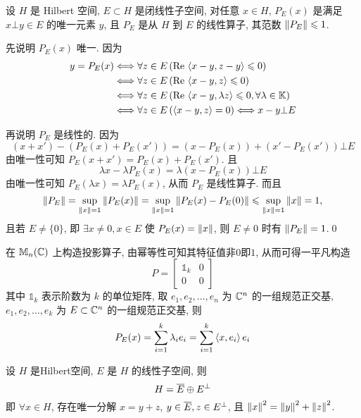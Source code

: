 		\begin{Theorem}[投影线性算子]
			 设 $ H $ 是 Hilbert 空间, $ E\subset H $ 是闭线性子空间,  对任意 $ x\in H $, $ P_{E}(x) $ 是满足 $ x\bot y\in E $ 的唯一元素 $ y $, 且 $ P_{E} $ 是从 $ H $ 到 $ E $ 的线性算子, 其范数 $ \norm{P_{E}}\leqslant1 $.
		\end{Theorem}
			
		\begin{Proof}
			先说明 $ P_{E}(x) $ 唯一. 因为
			\[
				\begin{aligned}
					y=P_{E}(x) & \Longleftrightarrow \forall z\in E\,(\Re\lrangle{x-y, z-y}\leqslant0)\\
					& \Longleftrightarrow \forall z\in E\,(\Re\lrangle{x-y, z}\leqslant0)\\
					& \Longleftrightarrow \forall z\in E\,(\Re\lrangle{x-y, \lambda z}\leqslant0, \forall \lambda\in \K)\\
					& \Longleftrightarrow \forall z\in E\,(\lrangle{x-y, z}=0)\Longleftrightarrow x-y\bot E
				\end{aligned}
			\]

			再说明 $ P_{E} $ 是线性的. 因为
			\[
				(x+x')-(P_{E}(x)+P_{E}(x'))=(x-P_{E}(x))+(x'-P_{E}(x'))\bot E
			\]
			由唯一性可知 $ P_{E}(x+x')=P_{E}(x)+P_{E}(x') $. 且
			\[
				\lambda x-\lambda P_{E}(x)=\lambda(x-P_{E}(x))\bot E
			\]
			由唯一性可知 $ P_{E}(\lambda x)=\lambda P_{E}(x) $, 从而 $ P_{E} $ 是线性算子. 而且
			\[
				\norm{P_{E}}=\sup_{\norm{x}=1}\norm{P_{E}(x)}=\sup_{\norm{x}=1}\norm{P_{E}(x)-P_{E}(0)}\leqslant\sup_{\norm{x}=1}\norm{x}=1,
			\]
			且若 $ E\ne \{ 0 \} $, 即 $ \exists x\ne 0, x\in E $ 使 $ P_{E}(x)=\norm{x} $, 则 $ E\ne 0 $ 时有 $ \norm{P_{E}}=1 $.\qed
		\end{Proof}
		 
		\begin{Example}
			在 $ \mathbb{M}_{n}(\C) $ 上构造投影算子, 由幂等性可知其特征值非$0$即$1$, 从而可得一平凡构造
			\[
				P=\begin{bmatrix}
					\mathds{1}_{k} & 0 \\
					0 & 0
				\end{bmatrix}
			\]
			其中 $ \mathds{1}_{k} $ 表示阶数为 $ k $ 的单位矩阵, 取 $ e_{1}, e_{2},\dots,e_{n} $ 为 $ \C^{n} $ 的一组规范正交基, $ e_{1}, e_{2},\dots,e_{k} $ 为 $ E\subset\C^{n} $ 的一组规范正交基, 则
			\[
				P_{E}(x)=\sum_{i=1}^{k}\lambda_{i}e_{i}=\sum_{i=1}^{k}\lrangle{x, e_{i}}e_{i}
			\]
		\end{Example}

	\begin{Corollary}[正交分解]
		设 $ H $ 是Hilbert空间, $ E $ 是 $ H $ 的线性子空间, 则
		\[
			H=\baro{E}\oplus E^{\bot}
		\]
		即 $ \forall x\in H $, 存在唯一分解 $ x=y+z $, $ y\in\baro{E}, z\in E^{\bot} $, 且 $ \norm{x}^{2}=\norm{y}^{2}+\norm{z}^{2} $.
	\end{Corollary}


